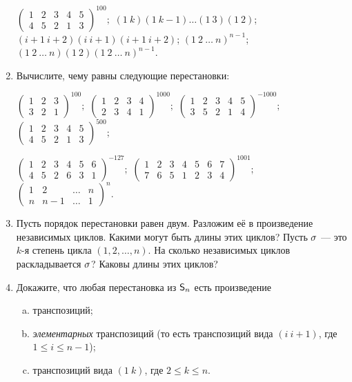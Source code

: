 \begin{enumerate}
\noindent\ipunkt $\displaystyle\begin{pmatrix}1&2&3&4&5\\4&5&2&1&3\end{pmatrix}^{100};$
\ipunkt $(1\ k)(1\ k-1)\ldots (1\ 3)(1\ 2)$;
\ipunkt $(i+1\ i+2)(i\ i+1)(i+1\ i+2)$;
\ipunkt $(1\ 2\ \ldots\ n)^{n-1}$;
\ipunkt $(1\ 2\ \ldots\ n)(1\ 2)(1\ 2\ \ldots\ n)^{n-1}$.


\item Вычислите, чему равны следующие перестановки:

\noindent\ipunkt $\displaystyle\begin{pmatrix}1&2&3\\3&2&1\end{pmatrix}^{100};$
\ipunkt $\displaystyle\begin{pmatrix}1&2&3&4\\2&3&4&1\end{pmatrix}^{1000};$
\ipunkt $\displaystyle\begin{pmatrix}1&2&3&4&5\\3&5&2&1&4\end{pmatrix}^{-1000};$
\ipunkt $\displaystyle\begin{pmatrix}1&2&3&4&5\\4&5&2&1&3\end{pmatrix}^{500};$

\noindent\ipunkt $\displaystyle\begin{pmatrix}1&2&3&4&5&6\\4&5&2&6&3&1\end{pmatrix}^{-127};$
\ipunkt $\displaystyle\begin{pmatrix}1&2&3&4&5&6&7\\7&6&5&1&2&3&4\end{pmatrix}^{1001};$
\ipunkt $\displaystyle\begin{pmatrix}1&2&\dots &n\\n&n-1&\dots &1\end{pmatrix}^{n}.$



\item \ipunkt Пусть порядок перестановки равен двум. Разложим её в
произведение независимых циклов. Какими могут быть длины этих
циклов? \ipunkt Пусть $\sigma$ --- это $k$-я степень цикла $(1, 2, \dots , n)$. На сколько
независимых циклов раскладывается $\sigma$? Каковы длины этих циклов?

\item \label{transp}Докажите, что любая перестановка из ${\mathsf{S}}_n$ есть произведение
\begin{enumerate}[a)]
\item транспозиций;
\item {\em элементарных} транспозиций (то есть транспозиций вида $(i\ i+1)$, где $1\leq i\leq n-1$);
\item транспозиций вида $(1\ k)$, где $2\leq k\leq n$.
\end{enumerate}



\end{enumerate}
